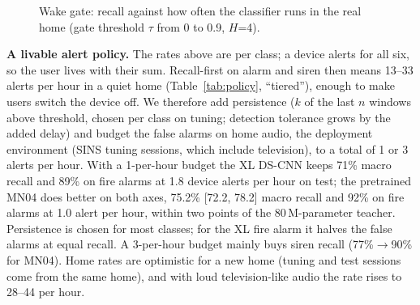 \documentclass[conference]{IEEEtran}
\begin{document}
\begin{figure}[t]\centering
{}
\caption{Wake gate: recall against how often the classifier runs in the real home (gate
threshold $\tau$ from 0 to 0.9, $H$=4).}\label{fig:gate}\end{figure}

\textbf{A livable alert policy.} The rates above are per class; a device alerts for all six, so
the user lives with their sum. Recall-first on alarm and siren then means 13--33 alerts per hour
in a quiet home (Table~\ref{tab:policy}, ``tiered''), enough to make users switch the device off.
We therefore add persistence ($k$ of the last $n$ windows above threshold, chosen per class on
tuning; detection tolerance grows by the added delay) and budget the false alarms on home audio,
the deployment environment (SINS tuning sessions, which include television), to a total of 1 or
3 alerts per hour. With a 1-per-hour budget the XL DS-CNN keeps 71\% macro recall and 89\% on
fire alarms at 1.8 device alerts per hour on test; the pretrained MN04 does better on both axes,
75.2\% [72.2, 78.2] macro recall and 92\% on fire alarms at 1.0 alert per hour, within two points
of the 80\,M-parameter teacher. Persistence is chosen for most classes; for the XL fire alarm it
halves the false alarms at equal recall. A 3-per-hour budget mainly buys siren recall
(77\%$\to$90\% for MN04).
Home rates are optimistic for a new home (tuning and test sessions come from the same home), and
with loud television-like audio the rate rises to 28--44 per hour.
\end{document}
